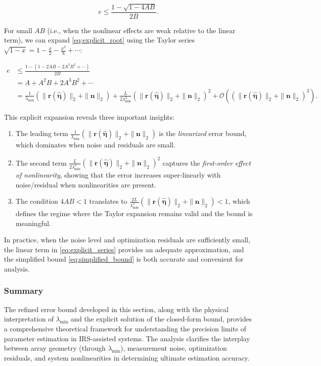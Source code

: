 \documentclass[journal]{IEEEtran}
\begin{document}
\begin{equation}
e \leq \frac{1 - \sqrt{1 - 4AB}}{2B}.
\label{eq:explicit_root}
\end{equation}

For small $AB$ (i.e., when the nonlinear effects are weak relative to the linear term), we can expand \eqref{eq:explicit_root} using the Taylor series $\sqrt{1-x} = 1 - \frac{x}{2} - \frac{x^2}{8} + \cdots$:

\begin{align}
e &\leq \frac{1 - (1 - 2AB - 2A^2B^2 + \cdots)}{2B} \nonumber \\
  &= A + A^2B + 2A^3B^2 + \cdots \nonumber \\
  &= \frac{1}{\lambda_{\min}}(\|\mathbf{r}(\hat{\boldsymbol{\eta}})\|_2 + \|\mathbf{n}\|_2) 
     + \frac{L}{2\lambda_{\min}^3}(\|\mathbf{r}(\hat{\boldsymbol{\eta}})\|_2 + \|\mathbf{n}\|_2)^2 
     + \mathcal{O}\left((\|\mathbf{r}(\hat{\boldsymbol{\eta}})\|_2 + \|\mathbf{n}\|_2)^3\right).
\label{eq:explicit_series}
\end{align}

This explicit expansion reveals three important insights:
\begin{enumerate}
    \item The leading term $\frac{1}{\lambda_{\min}}(\|\mathbf{r}(\hat{\boldsymbol{\eta}})\|_2 + \|\mathbf{n}\|_2)$ is the \textit{linearized} error bound, which dominates when noise and residuals are small.
    
    \item The second term $\frac{L}{2\lambda_{\min}^3}(\|\mathbf{r}(\hat{\boldsymbol{\eta}})\|_2 + \|\mathbf{n}\|_2)^2$ captures the \textit{first-order effect of nonlinearity}, showing that the error increases super-linearly with noise/residual when nonlinearities are present.
    
    \item The condition $4AB < 1$ translates to $\frac{2L}{\lambda_{\min}^2}(\|\mathbf{r}(\hat{\boldsymbol{\eta}})\|_2 + \|\mathbf{n}\|_2) < 1$, which defines the regime where the Taylor expansion remains valid and the bound is meaningful.
\end{enumerate}

In practice, when the noise level and optimization residuals are sufficiently small, the linear term in \eqref{eq:explicit_series} provides an adequate approximation, and the simplified bound \eqref{eq:simplified_bound} is both accurate and convenient for analysis.

\subsubsection{Summary}
The refined error bound developed in this section, along with the physical interpretation of $\lambda_{\min}$ and the explicit solution of the closed-form bound, provides a comprehensive theoretical framework for understanding the precision limits of parameter estimation in IRS-assisted systems. The analysis clarifies the interplay between array geometry (through $\lambda_{\min}$), measurement noise, optimization residuals, and system nonlinearities in determining ultimate estimation accuracy.
\end{document}
